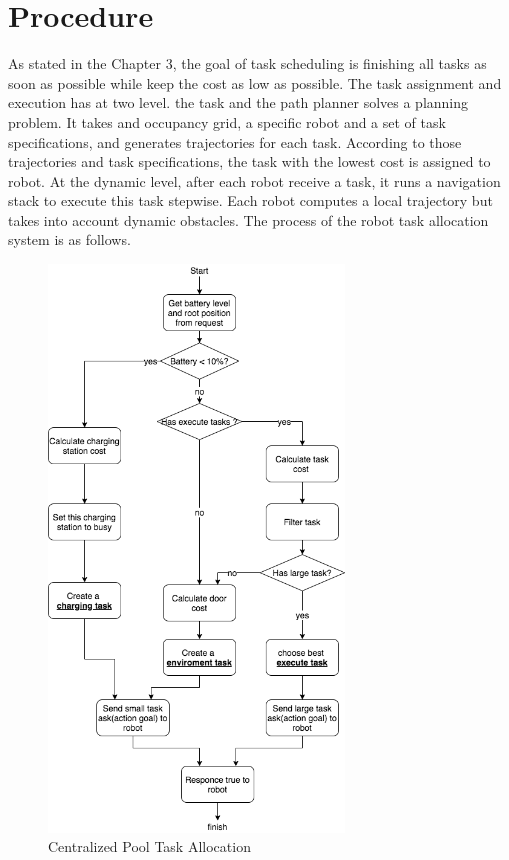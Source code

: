 \section{Procedure}
As stated in the Chapter 3, the goal of task scheduling is finishing all tasks as soon as possible while keep the cost as low as possible. 
The task assignment and execution has at two level. \cite{Ivan2017} the task and the path planner solves a planning problem. It takes and occupancy grid, a specific robot and a set of task specifications, and generates trajectories for each task. According to those trajectories and task specifications, the task with the lowest cost is assigned to robot.
At the dynamic level, after each robot receive a task, it runs a navigation stack to execute this task stepwise. Each robot computes a local trajectory but takes into account dynamic obstacles.
The process of the robot task allocation system is as follows.

\begin{figure}[htbp]
    \centering
    \includegraphics[width = 0.7\textwidth]{content/images/ch4/centralized_task_select.drawio.png}
    \caption{Centralized Pool Task Allocation}
    \label{fig:centralized_task_allocation}
\end{figure}
